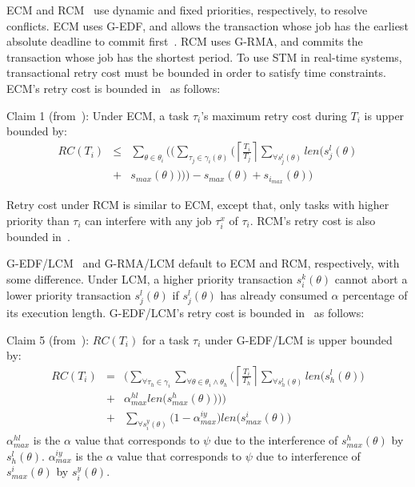 \documentclass[twocolumn]{article}
\begin{document}
ECM and RCM~\cite{stmconcurrencycontrol:emsoft11} use dynamic and fixed priorities, respectively, to resolve conflicts. ECM uses G-EDF, and allows the transaction whose job has the earliest absolute deadline to commit first~\cite{6045438}. RCM uses G-RMA, and commits the transaction whose job has the shortest period.
 To use STM in real-time systems, transactional retry cost must be bounded in order to satisfy time constraints.
  ECM's retry cost is bounded in~\cite{stmconcurrencycontrol:emsoft11} as follows:

Claim 1 (from~\cite{stmconcurrencycontrol:emsoft11}): Under ECM, a task $\tau_i$'s maximum retry cost during $T_i$ is upper bounded by:
\begin{eqnarray}
RC\left(T_{i}\right) & \le & \sum_{\theta\in\theta_{i}}\Bigg(\Big(\sum_{\tau_{j}\in\gamma_i(\theta)}\Big(\left\lceil\frac{T_{i}}{T_{j}}\right\rceil\sum_{\forall s_{j}^{l}(\theta)}len\big(s_{j}^{l}(\theta)\nonumber \\
 & + & s_{max}(\theta)\big)\Big)\Big)-s_{max}(\theta)+s_{i_{max}}(\theta)\Bigg)\label{eq3}\end{eqnarray}


Retry cost under RCM is similar to ECM, except that, only tasks with higher priority than $\tau_i$ can interfere with any job $\tau_i^x$ of $\tau_i$. RCM's retry cost is also bounded in~\cite{stmconcurrencycontrol:emsoft11}. 

G-EDF/LCM~\cite{lcmdac2012} and G-RMA/LCM default to ECM and RCM, respectively, with some difference. Under LCM, a higher priority transaction $s_i^k(\theta)$ cannot abort a lower priority transaction $s_j^l(\theta)$ if $s_j^l(\theta)$ has already consumed $\alpha$ percentage of its execution length. G-EDF/LCM's retry cost is bounded in~\cite{lcmdac2012} as follows:

Claim 5 (from~\cite{lcmdac2012}): $RC(T_i)$ for a task $\tau_i$ under G-EDF/LCM is upper bounded by:
\begin{eqnarray}
RC(T_i) & = & \Bigg(\sum_{\forall \tau_h \in \gamma_i}\sum_{\forall\theta \in \theta_i \wedge \theta_h}\Bigg(\left\lceil\frac{T_{i}}{T_{h}}\right\rceil\sum_{\forall s_{h}^{l}(\theta)}len\Big(s_{h}^{l}(\theta)\Big)\nonumber\\
& + & \alpha_{max}^{hl}len\Big(s_{max}^{h}(\theta)\Big)\Bigg)\Bigg)\nonumber\\
& + & \sum_{\forall s_{i}^{y}(\theta)}\Big(1-\alpha_{max}^{iy}\Big)len\Big(s_{max}^i(\theta)\Big)  
\label{eq78}\end{eqnarray} 
$\alpha_{max}^{hl}$ is the $\alpha$ value that corresponds to $\psi$ due to the interference of $s_{max}^h(\theta)$ by $s_h^l(\theta)$. $\alpha_{max}^{iy}$ is the $\alpha$ value that corresponds to $\psi$ due to interference of $s_{max}^i(\theta)$ by $s_i^y(\theta)$.
\end{document}
